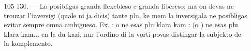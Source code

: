 \begin{VUpage}[109]{105}
\VUblanc{6.07pt}%
130. --- La  posibligas granda flexebleso e granda\nl
libereso; ma on devas ne trouzar l'inversigi (quale ni ja\nl
dicis) tante plu, ke mem la  inversigala ne posibligas\nl
evitar sempre omna ambigueso. Ex. : \cc
{} o  ne esas plu klara\nl
kam :  (o ) \nl
{} ne esas plu klara\nl
kam...  en la du kazi, nur l'ordino\nl
di la vorti povas distingar la subjekto de la komplemento.
\end{VUpage}

